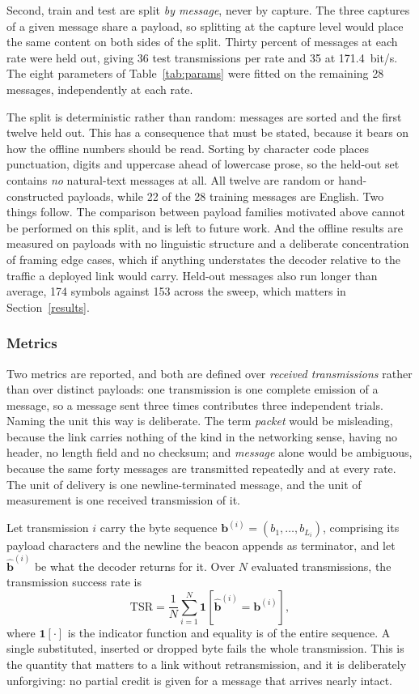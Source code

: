 Second, train and test are split \emph{by message}, never by capture. The three
captures of a given message share a payload, so splitting at the capture level
would place the same content on both sides of the split. Thirty percent of
messages at each rate were held out, giving 36 test transmissions per rate and
35 at 171.4~bit/s. The eight parameters of Table~\ref{tab:params} were fitted
on the remaining 28 messages, independently at each rate.

The split is deterministic rather than random: messages are sorted and the
first twelve held out. This has a consequence that must be stated, because it
bears on how the offline numbers should be read. Sorting by character code
places punctuation, digits and uppercase ahead of lowercase prose, so the
held-out set contains \emph{no} natural-text messages at all. All twelve are
random or hand-constructed payloads, while 22 of the 28 training messages are
English. Two things follow. The comparison between payload families motivated
above cannot be performed on this split, and is left to future work. And the
offline results are measured on payloads with no linguistic structure and a
deliberate concentration of framing edge cases, which if anything understates
the decoder relative to the traffic a deployed link would carry. Held-out
messages also run longer than average, 174 symbols against 153 across the
sweep, which matters in Section~\ref{results}.

\subsubsection{Metrics}

Two metrics are reported, and both are defined over \emph{received
transmissions} rather than over distinct payloads: one transmission is one
complete emission of a message, so a message sent three times contributes three
independent trials. Naming the unit this way is deliberate. The term
\emph{packet} would be misleading, because the link carries nothing of the kind
in the networking sense, having no header, no length field and no checksum;
and \emph{message} alone would be ambiguous, because the same forty messages
are transmitted repeatedly and at every rate. The unit of delivery is one
newline-terminated message, and the unit of measurement is one received
transmission of it.

Let transmission $i$ carry the byte sequence
$\mathbf{b}^{(i)}=(b_1,\dots,b_{L_i})$, comprising its payload characters and
the newline the beacon appends as terminator, and let $\hat{\mathbf{b}}^{(i)}$
be what the decoder returns for it. Over $N$ evaluated transmissions, the
transmission success rate is
\begin{equation}
\mathrm{TSR} = \frac{1}{N}\sum_{i=1}^{N}
  \mathbf{1}\!\left[\hat{\mathbf{b}}^{(i)} = \mathbf{b}^{(i)}\right],
\label{eq:tsr}
\end{equation}
where $\mathbf{1}[\cdot]$ is the indicator function and equality is of the
entire sequence. A single substituted, inserted or dropped byte fails the whole
transmission. This is the quantity that matters to a link without
retransmission, and it is deliberately unforgiving: no partial credit is given
for a message that arrives nearly intact.

